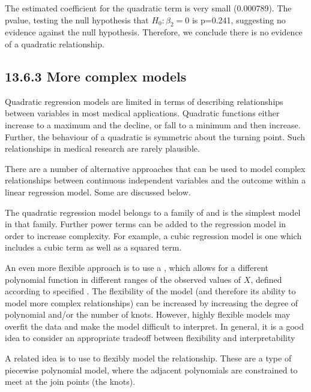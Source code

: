 \documentclass[letterpaper,10pt,english]{jupyterBook}
\begin{document}
\sphinxAtStartPar
The estimated coefficient for the quadratic term is very small (\sphinxhyphen{}0.000789). The p\sphinxhyphen{}value, testing the null hypothesis that \(H_0: \beta_2 = 0\) is p=0.241, suggesting no evidence against the null hypothesis. Therefore, we conclude there is no evidence of a quadratic relationship.


\subsection{13.6.3 More complex models}
\label{\detokenize{13.f. Linear Regression II:more-complex-models}}
\sphinxAtStartPar
Quadratic regression models are limited in terms of describing relationships between variables in most medical applications. Quadratic functions either increase to a maximum and the decline, or fall to a minimum and then increase. Further, the behaviour of a quadratic is symmetric about the turning point. Such relationships in medical research are rarely plausible.

\sphinxAtStartPar
There are a number of alternative approaches that can be used to model complex relationships between continuous independent variables and the outcome within a linear regression model. Some are discussed below.

\sphinxAtStartPar
The quadratic regression model belongs to a family of  and is the simplest model in that family. Further power terms can be added to the regression model in order to increase complexity. For example, a cubic regression model is one which includes a cubic term as well as a squared term.

\sphinxAtStartPar
An even more flexible approach is to use a , which allows for a different polynomial function in different ranges of the observed values of \(X\), defined according to specified . The flexibility of the model (and therefore its ability to model more complex relationships) can be increased by increasing the degree of polynomial and/or the number of knots. However, highly flexible models may overfit the data and make the model difficult to interpret. In general, it is a good idea to consider an appropriate trade\sphinxhyphen{}off between flexibility and interpretability

\sphinxAtStartPar
A related idea is to use  to flexibly model the relationship. These are a type of piecewise polynomial model, where the adjacent polynomials are constrained to meet at the join points (the knots).
\end{document}
